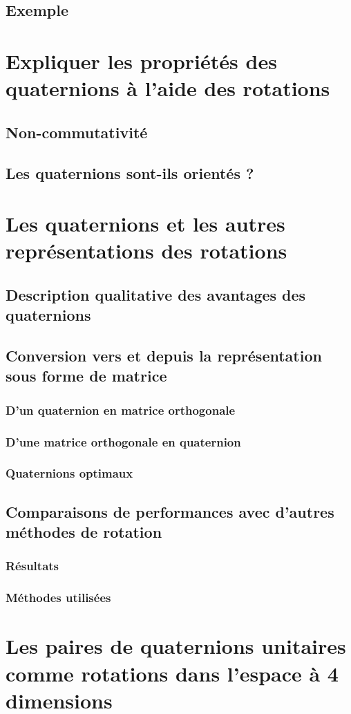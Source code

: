 	\subsection{Exemple}
	
\section{Expliquer les propriétés des quaternions à l'aide des rotations}
	\subsection{Non-commutativité}
	\subsection{Les quaternions sont-ils orientés ?}
	
\section{Les quaternions et les autres représentations des rotations}
	\subsection{Description qualitative des avantages des quaternions}
	\subsection{Conversion vers et depuis la représentation sous forme de matrice}
		\subsubsection{D'un quaternion en matrice orthogonale}
		\subsubsection{D'une matrice orthogonale en quaternion}
		\subsubsection{Quaternions optimaux}
	\subsection{Comparaisons de performances avec d'autres méthodes de rotation}
		\subsubsection{Résultats}
		\subsubsection{Méthodes utilisées}
\section{Les paires de quaternions unitaires comme rotations dans l'espace à 4 dimensions}